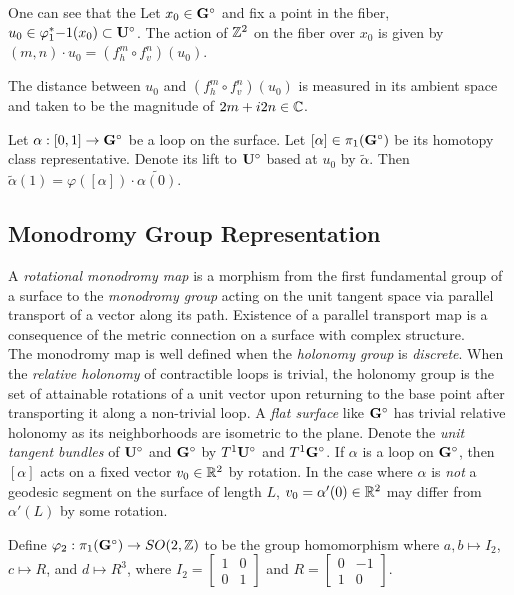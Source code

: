 \documentclass[]{article}
\begin{document}
\begin{figure}[H]
\centering

\end{figure}

One can see that the Let $x_0\in\mathbf{G}^\circ$ and fix a point in the fiber,  $u_0\in\varphi_1^*{-1}(x_0)\subset\mathbf{U}^\circ$. The action of $\mathbb{Z}^2$ on the fiber over $x_0$ is given by $(m,n)\cdot u_0=(f_h^m\circ f_v^n)(u_0)$. 

The distance between $u_0$ and $(f_h^m\circ f_v^n)(u_0)$ is measured in its ambient space and taken to be the magnitude of $2m+i2n\in\mathbb{C}$. 

\begin{lem}
Let $\alpha:[0,1]\rightarrow \mathbf{G}^\circ$ be a loop on the surface. Let $[\alpha]\in\pi_1(\mathbf{G}^\circ)$ be its homotopy class representative. Denote its lift to $\mathbf{U}^\circ$ based at $u_0$ by $\tilde{\alpha}$. Then $\tilde{\alpha}(1)=\varphi([\alpha])\cdot\tilde{\alpha(0)}$.
\end{lem}

\subsection{Monodromy Group Representation}
A \emph{rotational monodromy map} is a morphism from the first fundamental group of a surface to the \emph{monodromy group} acting on the unit tangent space via parallel transport of a vector along its path. Existence of a parallel transport map is a consequence of the metric connection on a surface with complex structure.
\\
The monodromy map is well defined when the \emph{holonomy group} is \emph{discrete}. When the \emph{relative holonomy} of contractible loops is trivial, the holonomy group is the set of attainable rotations of a unit vector upon returning to the base point after transporting it along a non-trivial loop. A \emph{flat surface} like $\mathbf{G}^\circ$ has trivial relative holonomy as its neighborhoods are isometric to the plane. Denote the \emph{unit tangent bundles} of $\mathbf{U}^\circ$ and $\mathbf{G}^\circ$ by $T^1\mathbf{U}^\circ$ and $T^1\mathbf{G}^\circ$. If $\alpha$ is a loop on $\mathbf{G}^\circ$, then $[\alpha]$ acts on a fixed vector $v_0\in\mathbb{R}^2$ by rotation. In the case where $\alpha$ is \emph{not} a geodesic segment on the surface of length $L$, $v_0=\alpha'(0)\in\mathbb{R}^2$ may differ from $\alpha'(L)$ by some rotation.

\begin{Def}
Define $\varphi_2:\pi_1(\mathbf{G}^\circ)\rightarrow SO(2,\mathbb{Z})$ to be the group homomorphism where $a,b \mapsto I_2$, $c  \mapsto R$, and $d  \mapsto R^3$, where $I_2=\begin{bmatrix}1 & 0\\0 & 1\end{bmatrix}$ and $R=\begin{bmatrix}0 & -1 \\1 & 0\end{bmatrix}$.
\end{Def}
\end{document}
